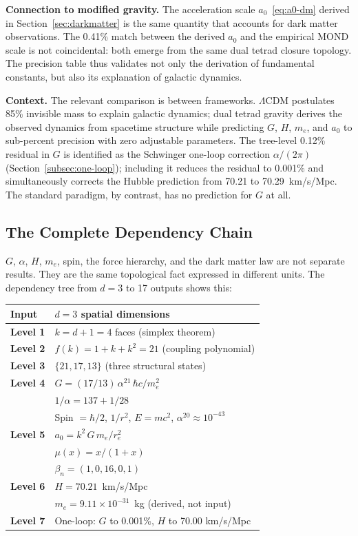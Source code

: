 \documentclass[aps,prd,preprint,superscriptaddress,showpacs,preprintnumbers,amsmath,amssymb,nofootinbib]{revtex4-2}
\begin{document}
\textbf{Connection to modified gravity.} The acceleration scale $a_0$~\eqref{eq:a0-dm} derived in Section~\ref{sec:darkmatter} is the same quantity that accounts for dark matter observations. The 0.41\% match between the derived $a_0$ and the empirical MOND scale is not coincidental: both emerge from the same dual tetrad closure topology. The precision table thus validates not only the derivation of fundamental constants, but also its explanation of galactic dynamics.

\textbf{Context.} The relevant comparison is between frameworks. $\Lambda$CDM postulates 85\% invisible mass to explain galactic dynamics; dual tetrad gravity derives the observed dynamics from spacetime structure while predicting $G$, $H$, $m_e$, and $a_0$ to sub-percent precision with zero adjustable parameters. The tree-level 0.12\% residual in $G$ is identified as the Schwinger one-loop correction $\alpha/(2\pi)$ (Section~\ref{subsec:one-loop}); including it reduces the residual to 0.001\% and simultaneously corrects the Hubble prediction from 70.21 to 70.29~km/s/Mpc. The standard paradigm, by contrast, has no prediction for $G$ at all.

\subsection{The Complete Dependency Chain}
\label{subsec:dependency}

$G$, $\alpha$, $H$, $m_e$, spin, the force hierarchy, and the dark matter law are not separate results. They are the same topological fact expressed in different units. The dependency tree from $d = 3$ to 17 outputs shows this:

\begin{center}
\renewcommand{\arraystretch}{1.3}
\begin{tabular}{@{}ll@{}}
\textbf{Input} & $d = 3$ spatial dimensions \\
\midrule
\textbf{Level 1} & $k = d + 1 = 4$ faces (simplex theorem) \\
\textbf{Level 2} & $f(k) = 1 + k + k^2 = 21$ (coupling polynomial) \\
\textbf{Level 3} & $\{21, 17, 13\}$ (three structural states) \\
\textbf{Level 4} & $G = (17/13)\,\alpha^{21}\,\hbar c/m_e^2$ \\
 & $1/\alpha = 137 + 1/28$ \\
 & Spin $= \hbar/2$, $1/r^2$, $E = mc^2$, $\alpha^{20} \approx 10^{-43}$ \\
\textbf{Level 5} & $a_0 = k^2\,G\,m_e/r_e^2$ \\
 & $\mu(x) = x/(1+x)$ \\
 & $\beta_n = (1, 0, 16, 0, 1)$ \\
\textbf{Level 6} & $H = 70.21$~km/s/Mpc \\
 & $m_e = 9.11 \times 10^{-31}$~kg (derived, not input) \\
\textbf{Level 7} & One-loop: $G$ to 0.001\%, $H$ to 70.00 km/s/Mpc \\
\end{tabular}
\end{center}
\end{document}
